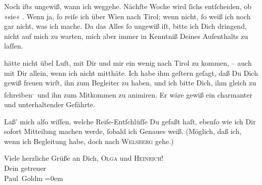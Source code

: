 \pstart
           Noch iſts ungewiß, wann ich weggehe. Nächſte Woche wird{ }ſichs entſcheiden, ob »sie« \label{K_L03379-2v}\label{K_L03379-2}. Wenn ja,{ }ſo \strikeout{\textcolor{gray}{k}} reiſe ich über Wien nach Tirol; wenn nicht,{ }ſo weiß ich noch gar nicht, was ich
               mache. Da das Alles{ }ſo ungewiß iſt, bitte ich Dich dringend, nicht auf mich zu
               warten, mich aber immer in Kenntniß Deines Aufenthalts {\pb}zu laſſen.\pend
           
\pstart
           \label{K_L03379-3v}\label{K_L03379-3} hätte nicht übel
               Luſt, mit Dir und mir ein wenig nach Tirol zu kommen, – auch mit Dir allein, wenn ich nicht mitthäte. Ich habe
               ihm geſtern geſagt, daß Du Dich gewiß freuen wirſt,
               ihn zum Begleiter zu haben, und ich bitte Dich, ihm gleich zu{ }ſchreiben\substVorne{}\textsuperscript{,}\substDazwischen{} und\substHinten{} ihn zum Mitkommen zu animiren. Er wäre gewiß ein charmanter und
               unterhaltender Gefährte.\pend
           
\pstart
           Laß’ mich alſo wiſſen, {\pb}welche Reiſe-Entſchlüſſe Du
               gefaßt haſt, ebenſo wie ich Dir sofort Mitteilung machen werde,{ }ſobald ich Genaues
               weiß. (Möglich, daß ich, wenn ich Begleitung habe, doch nach \textsc{Welsberg} gehe.)\pend
           
\pstart
           Viele herzliche Grüße an Dich, \textsc{Olga} und \textsc{Heinrich}! {\\[\baselineskip]}Dein getreuer {\\[\baselineskip]}\spacefill\mbox{Paul Goldm}\pend
           \leftskip=0em{}\endnumbering{}  \newcommand{\dateiname}{L03379}\newcommand{\titel}{Paul Goldmann an Arthur Schnitzler, 31. 7. [1903]}\newcommand{\editorInnen}{Martin Anton Müller und Laura Untner}
